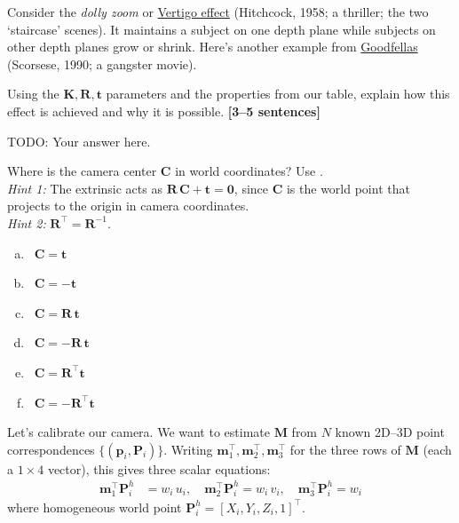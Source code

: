 \documentclass{csci1430}
\begin{document}
\begin{subquestion}[points=2]
Consider the \emph{dolly zoom} or \href{https://www.youtube.com/watch?v=G7YJkBcRWB8}{Vertigo effect} (Hitchcock, 1958; a thriller; the two `staircase' scenes). It maintains a subject on one depth plane while subjects on other depth planes grow or shrink. Here's another example from \href{https://www.youtube.com/watch?v=HZNBtx6RAn4}{Goodfellas} (Scorsese, 1990; a gangster movie).

Using the $\mathbf{K},\mathbf{R},\mathbf{t}$ parameters and the properties from our table, explain how this effect is achieved and why it is possible.
\textbf{[3--5 sentences]}
\end{subquestion}

\begin{answer}[height=12]
TODO: Your answer here.
\end{answer}


\begin{subquestion}[points=1]
Where is the camera center $\mathbf{C}$ in world coordinates? Use \filled. \\
\emph{Hint 1:} The extrinsic acts as $\mathbf{R}\,\mathbf{C} + \mathbf{t} = \mathbf{0}$, since $\mathbf{C}$ is the world point that projects to the origin in camera coordinates.\\
\emph{Hint 2:} $\mathbf{R}^\top = \mathbf{R}^{-1}$.
\end{subquestion}
\begin{answer}[height=9]
\begin{enumerate}[(a),leftmargin=12pt]
    \item \cbox~$\mathbf{C} = \mathbf{t}$
    \item \cbox~$\mathbf{C} = -\mathbf{t}$
    \item \cbox~$\mathbf{C} = \mathbf{R}\,\mathbf{t}$
    \item \cbox~$\mathbf{C} = -\mathbf{R}\,\mathbf{t}$
    \item \cbox~$\mathbf{C} = \mathbf{R}^{\top} \mathbf{t}$
    \item \cbox~$\mathbf{C} = -\mathbf{R}^{\top} \mathbf{t}$
\end{enumerate}
\end{answer}


\pagebreak

\begin{question}[points=13,drawbox=false]
Let's calibrate our camera. We want to estimate $\mathbf{M}$ from $N$ known 2D--3D point correspondences $\{(\mathbf{p}_i, \mathbf{P}_i)\}$. Writing $\mathbf{m}_1^\top, \mathbf{m}_2^\top, \mathbf{m}_3^\top$ for the three rows of $\mathbf{M}$ (each a $1\times4$ vector), this gives three scalar equations:
%
\begin{align*}
\mathbf{m}_1^\top \mathbf{P}_i^h &= w_i\, u_i, \quad
\mathbf{m}_2^\top \mathbf{P}_i^h = w_i\, v_i, \quad
\mathbf{m}_3^\top \mathbf{P}_i^h = w_i
\end{align*}
%
where homogeneous world point $\mathbf{P}_i^h = [X_i, Y_i, Z_i, 1]^\top$.
\end{question}
\end{document}
